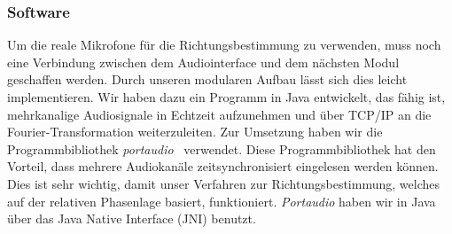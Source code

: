 \subsubsection{Software}
Um die reale Mikrofone für die Richtungsbestimmung zu verwenden, muss noch eine Verbindung zwischen dem Audiointerface und dem nächsten Modul geschaffen werden. Durch unseren modularen Aufbau lässt sich dies leicht implementieren. Wir haben dazu ein Programm in Java entwickelt, das fähig ist, mehrkanalige Audiosignale in Echtzeit aufzunehmen und über TCP/IP an die Fourier-Transformation weiterzuleiten. Zur Umsetzung haben wir die Programmbibliothek \textit{portaudio}~\cite{portaudio} verwendet. Diese Programmbibliothek hat den Vorteil, dass mehrere Audiokanäle zeitsynchronisiert eingelesen werden können. Dies ist sehr wichtig, damit unser Verfahren zur Richtungsbestimmung, welches auf der relativen Phasenlage basiert, funktioniert. \textit{Portaudio} haben wir in Java über das Java Native Interface (JNI) benutzt.

